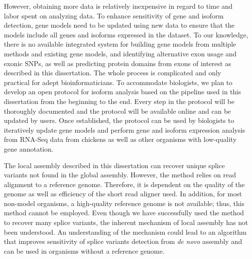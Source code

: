 However, obtaining more data is relatively inexpensive in
regard to time and labor spent on analyzing data.  To
enhance sensitivity of gene and isoform detection, gene
models need to be updated using new data to ensure that the
models include all genes and isoforms expressed in the
dataset. To our knowledge, there is no available integrated
system for building gene models from multiple methods and
existing gene models, and identifying alternative exon usage and
exonic SNPs, as well as predicting protein domains from exons
of interest as described in this dissertation. The whole
process is complicated and only practical for adept
bioinformaticians.  To accommodate biologists, we plan to
develop an open protocol for isoform analysis based on the
pipeline used in this dissertation from the beginning to the
end. Every step in the protocol will be thoroughly
documented and the protocol will be available online and can
be updated by users.  Once established, the protocol can be
used by biologists to iteratively update gene models and
perform gene and isoform expression analysis from RNA-Seq
data from chickens as well as other organisms with
low-quality gene annotation.

The local assembly described in this dissertation can
recover unique splice variants not found in the global
assembly. However, the method relies on read alignment to a
reference genome. Therefore, it is dependent on the quality
of the genome as well as efficiency of the short read aligner
used. In addition, for most non-model organisms, a
high-quality reference genome is not available; thus, this
method cannot be employed. Even though we have successfully
used the method to recover many splice variants, the
inherent mechanism of local assembly has not been
understood.  An understanding of the mechanism could
lead to an algorithm that improves sensitivity of splice
variants detection from {\em de novo} assembly and can be
used in organisms without a reference genome.
